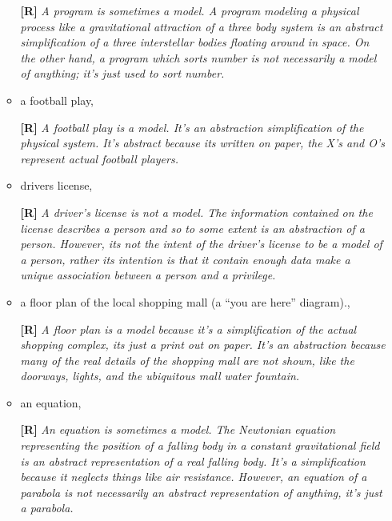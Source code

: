 \begin{enumerate}
\begin{itemize}
    \begin{onlysolution}
      \textbf{[R]}
      \itshape
      A program is sometimes a model. A program modeling a physical process like 
      a gravitational attraction of a three body system is an abstract simplification 
      of a three interstellar bodies floating around in space. On the other hand, 
      a program which sorts number is not necessarily a model of anything; it’s just 
      used to sort number.
    \end{onlysolution}

  \item a football play, 

    \begin{onlysolution}
      \textbf{[R]}
      \itshape
      A football play is a model. It’s an abstraction simplification of the physical 
      system. It’s abstract because its written on paper, the X’s and O’s represent 
      actual football players.
    \end{onlysolution}

  \item drivers license,

    \begin{onlysolution}
      \textbf{[R]}
      \itshape
      A driver’s license is not a model. The information contained on the license describes 
      a person and so to some extent is an abstraction of a person. However, its not the 
      intent of the driver’s license to be a model of a person, rather its intention is that 
      it contain enough data make a unique association between a person and a privilege.
    \end{onlysolution}

  \item a floor plan of the local shopping mall (a ``you are here'' diagram)., 

    \begin{onlysolution}
      \textbf{[R]}
      \itshape
      A floor plan is a model because it’s a simplification of the actual shopping 
      complex, its just a print out on paper. It’s an abstraction because many of 
      the real details of the shopping mall are not shown, like the doorways, lights, 
      and the ubiquitous mall water fountain.
    \end{onlysolution}

  \item an equation, 

    \begin{onlysolution}
      \textbf{[R]}
      \itshape
      An equation is sometimes a model. The Newtonian equation representing the position 
      of a falling body in a constant gravitational field is an abstract representation of 
      a real falling body. It’s a simplification because it neglects things like air 
      resistance. However, an equation of a parabola is not necessarily an abstract 
      representation of anything, it’s just a parabola.
    \end{onlysolution}


\end{itemize}
\end{enumerate}
